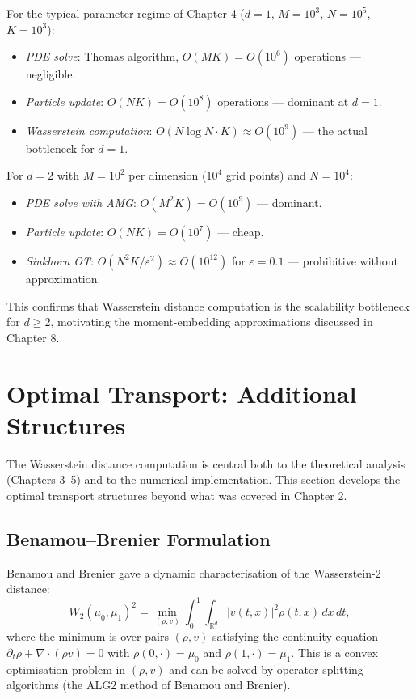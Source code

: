 For the typical parameter regime of Chapter 4 ($d=1$, $M=10^3$, $N=10^5$,
$K=10^3$):
\begin{itemize}
    \item \textit{PDE solve}: Thomas algorithm, $O(MK) = O(10^6)$ operations
    — negligible.
    \item \textit{Particle update}: $O(NK) = O(10^8)$ operations — dominant
    at $d=1$.
    \item \textit{Wasserstein computation}: $O(N\log N \cdot K) \approx O(10^9)$
    — the actual bottleneck for $d=1$.
\end{itemize}

For $d=2$ with $M=10^2$ per dimension ($10^4$ grid points) and $N=10^4$:
\begin{itemize}
    \item \textit{PDE solve with AMG}: $O(M^2 K) = O(10^9)$ — dominant.
    \item \textit{Particle update}: $O(NK) = O(10^7)$ — cheap.
    \item \textit{Sinkhorn OT}: $O(N^2 K / \varepsilon^2) \approx O(10^{12})$
    for $\varepsilon=0.1$ — prohibitive without approximation.
\end{itemize}
This confirms that Wasserstein distance computation is the scalability bottleneck
for $d \ge 2$, motivating the moment-embedding approximations discussed in
Chapter 8.

\section{Optimal Transport: Additional Structures}
\label{sec:sc-ot}

The Wasserstein distance computation is central both to the theoretical analysis
(Chapters 3--5) and to the numerical implementation. This section develops the
optimal transport structures beyond what was covered in Chapter 2.

\subsection{Benamou--Brenier Formulation}

Benamou and Brenier \citep{benamoubrenier2000} gave a dynamic characterisation
of the Wasserstein-2 distance:
\begin{equation}
    W_2(\mu_0, \mu_1)^2 = \min_{(\rho, v)} \int_0^1 \int_{\mathbb{R}^d}
    |v(t,x)|^2 \rho(t,x)\, dx\, dt,
    \label{eq:bb-formulation}
\end{equation}
where the minimum is over pairs $(\rho, v)$ satisfying the continuity equation
$\partial_t \rho + \nabla \cdot (\rho v) = 0$ with $\rho(0,\cdot) = \mu_0$
and $\rho(1,\cdot) = \mu_1$. This is a convex optimisation problem in $(\rho, v)$
and can be solved by operator-splitting algorithms (the ALG2 method of Benamou
and Brenier).

